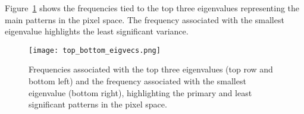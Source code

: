 \documentclass[12pt]{article}
\begin{document}
Figure~\ref*{fig:top_bottom_eigvecs} shows the frequencies tied to the top
three eigenvalues representing the main patterns in the pixel space. The
frequency associated with the smallest eigenvalue highlights the least
significant variance.

\begin{figure}[htbp] 
	\centering
	\texttt{[image: top\_bottom\_eigvecs.png]} 
\caption{Frequencies associated with the top three eigenvalues (top row and
bottom left) and the frequency associated with the smallest eigenvalue (bottom
right), highlighting the primary and least significant patterns in the pixel
space.}
	\label{fig:top_bottom_eigvecs} 
\end{figure}
\end{document}
